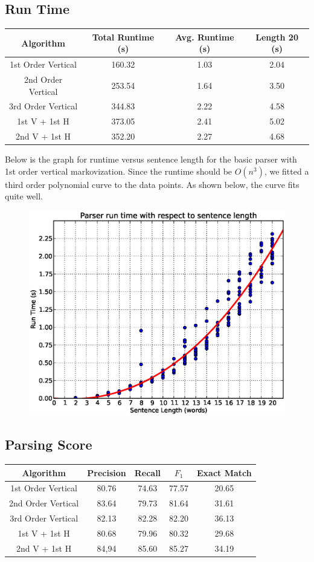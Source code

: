 \documentclass[12pt]{article}
\begin{document}
\subsection{Run Time}
\begin{center}
\begin{tabular}{|c|c|c|c|}
\hline
Algorithm & Total Runtime (s) & Avg. Runtime (s) & Length 20 (s)\\\hline
1st Order Vertical & 160.32 & 1.03 & 2.04 \\\hline
2nd Order Vertical & 253.54 & 1.64 & 3.50 \\\hline
3rd Order Vertical & 344.83  & 2.22 & 4.58 \\\hline
1st V + 1st H & 373.05 & 2.41 & 5.02 \\\hline
2nd V + 1st H & 352.20 & 2.27 & 4.68 \\\hline
\end{tabular}
\end{center}
Below is the graph for runtime versus sentence length for the basic parser with 1st order vertical markovization. Since the runtime should be $O(n^3)$, we fitted a third order polynomial curve to the data points. As shown below, the curve fits quite well.
\begin{figure}[H]
\centering
\includegraphics[width=0.5\linewidth]{./stats/runtime}
\end{figure}
\subsection{Parsing Score}
\begin{center}
\begin{tabular}{|c|c|c|c|c|}
\hline
Algorithm & Precision & Recall & $F_1$ & Exact Match \\\hline
1st Order Vertical & 80.76 & 74.63 & 77.57 & 20.65\\\hline
2nd Order Vertical & 83.64 & 79.73 & 81.64 & 31.61 \\\hline
3rd Order Vertical & 82.13 & 82.28 & 82.20 & 36.13 \\\hline
1st V + 1st H & 80.68 & 79.96 & 80.32 & 29.68 \\\hline
2nd V + 1st H & 84,94 & 85.60 & 85.27 & 34.19 \\\hline
\end{tabular}
\end{center}
\end{document}
